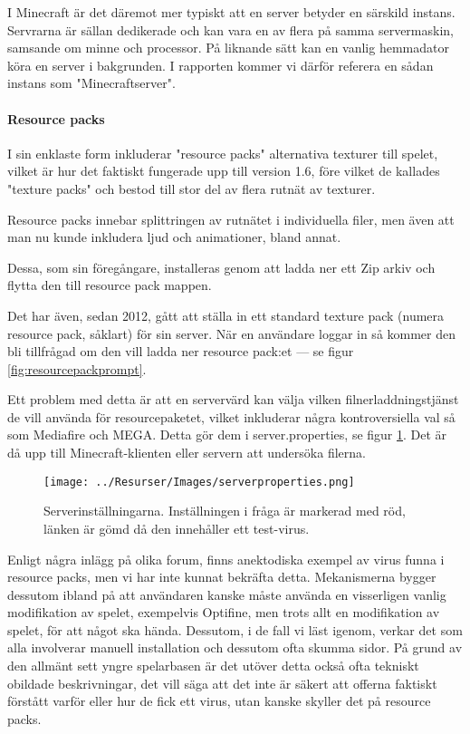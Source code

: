 \documentclass[journal,comsoc]{IEEEtran}
\begin{document}
I Minecraft är det däremot mer typiskt att en server betyder en särskild instans. Servrarna är sällan dedikerade och kan vara en av flera på samma servermaskin, samsande om minne och processor. På liknande sätt kan en vanlig hemmadator köra en server i bakgrunden. I rapporten kommer vi därför referera en sådan instans som "Minecraftserver".

\label{par:resourcepack}
\paragraph{Resource packs}
I sin enklaste form inkluderar "resource packs" alternativa texturer till spelet, vilket är hur det faktiskt fungerade upp till version 1.6, \cite{fanmcwiki:texturepack} före vilket de kallades "texture packs" och bestod till stor del av flera rutnät av texturer. 

Resource packs innebar splittringen av rutnätet i individuella filer, men även att man nu kunde inkludera ljud och animationer, bland annat. \cite{fanmcwiki:resourcepack}

Dessa, som sin föregångare, installeras genom att ladda ner ett Zip arkiv och flytta den till resource pack mappen.

Det har även, sedan 2012, \cite{dinnerbone:twitter:servertexturepack} \cite{mcwiki:java1.3.1} gått att ställa in ett standard texture pack (numera resource pack, såklart) för sin server.  När en användare loggar in så kommer den bli tillfrågad om den vill ladda ner resource pack:et --- se figur \ref{fig:resourcepackprompt}. 

Ett problem med detta är att en servervärd kan välja vilken filnerladdningstjänst de vill använda för resourcepaketet, vilket inkluderar några kontroversiella val så som Mediafire och MEGA. Detta gör dem i server.properties, se figur \ref{fig:serverproperties}. Det är då upp till Minecraft-klienten eller servern att undersöka filerna. 

\begin{figure} [H]
  \centering
  \texttt{[image: ../Resurser/Images/serverproperties.png]}
  \caption{Serverinställningarna. Inställningen i fråga är markerad med röd, länken är gömd då den innehåller ett test-virus.}
  \label{fig:serverproperties}
\end{figure}


Enligt några inlägg på olika forum, finns anektodiska exempel av virus funna i resource packs, men vi har inte kunnat bekräfta detta. Mekanismerna bygger dessutom ibland på att användaren kanske måste använda en visserligen vanlig modifikation av spelet, exempelvis Optifine, men trots allt en modifikation av spelet, för att något ska hända. Dessutom, i de fall vi läst igenom, verkar det som alla involverar manuell installation och dessutom ofta skumma sidor. På grund av den allmänt sett yngre spelarbasen är det utöver detta också ofta tekniskt obildade beskrivningar, det vill säga att det inte är säkert att offerna faktiskt förstått varför eller hur de fick ett virus, utan kanske skyller det på resource packs.
\end{document}
